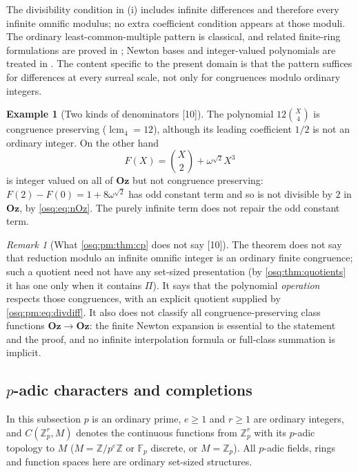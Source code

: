 \documentclass[11pt,letterpaper]{article}
\numberwithin{equation}{section}
\theoremstyle{definition}
\newtheorem{example}[example]{Example}
\theoremstyle{remark}
\newtheorem{remark}[remark]{Remark}
\theoremstyle{plain}
\newcommand{\Oz}{\mathbf{Oz}}
\newcommand{\Z}{\mathbb Z}
\newcommand{\F}{\mathbb F}
\newcommand{\lcm}{\operatorname{lcm}}
\newcommand{\src}[1]{\textup{\textsf{[#1]}}}
\begin{document}
The divisibility condition in (i) includes infinite differences and therefore every
infinite omnific modulus; no extra coefficient condition appears at those moduli. The
ordinary least-common-multiple pattern is classical, and related finite-ring formulations
are proved in \cite{CGG}; Newton bases and integer-valued polynomials are treated in
\cite{CC}. The content specific to the present domain is that the pattern suffices for
differences at every surreal scale, not only for congruences modulo ordinary integers.

\begin{example}[Two kinds of denominators \src{10}]\label{osq:pm:ex:cp}
The polynomial $12\binom X4$ is congruence preserving ($\lcm_4=12$), although its leading
coefficient $1/2$ is not an ordinary integer. On the other hand
\[
 F(X)=\binom X2+\omega^{\sqrt2}X^3
\]
is integer valued on all of $\Oz$ but not congruence preserving:
$F(2)-F(0)=1+8\omega^{\sqrt2}$ has odd constant term and so is not divisible by $2$ in
$\Oz$, by \eqref{osq:eq:nOz}. The purely infinite term does not repair the odd constant
term.
\end{example}

\begin{remark}[What \cref{osq:pm:thm:cp} does not say \src{10}]\label{osq:pm:rem:cpnot}
The theorem does not say that reduction modulo an infinite omnific integer is an ordinary
finite congruence; such a quotient need not have any set-sized presentation (by
\cref{osq:thm:quotients} it has one only when it contains $\Pi$). It says that the
polynomial \emph{operation} respects those congruences, with an explicit quotient
supplied by \eqref{osq:pm:eq:divdiff}. It also does not classify all congruence-preserving
class functions $\Oz\to\Oz$: the finite Newton expansion is essential to the statement and
the proof, and no infinite interpolation formula or full-class summation is implicit.
\end{remark}

\subsection{\texorpdfstring{$p$}{p}-adic characters and completions}\label{osq:pm:sub:padic}

In this subsection $p$ is an ordinary prime, $e\ge1$ and $r\ge1$ are ordinary integers,
and $C(\Z_p^r,M)$ denotes the continuous functions from $\Z_p^r$ with its $p$-adic
topology to $M$ ($M=\Z/p^e\Z$ or $\F_p$ discrete, or $M=\Z_p$). All $p$-adic fields,
rings and function spaces here are ordinary set-sized structures.
\end{document}
